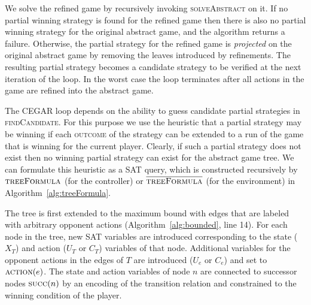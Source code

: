 We solve the refined game by recursively invoking \textsc{solveAbstract} on it.
If no partial winning strategy is found for the refined game then there is also
no partial winning strategy for the original abstract game, and the algorithm
returns a failure.  Otherwise, the partial strategy for the refined game is
\emph{projected} on the original abstract game by removing the leaves
introduced by refinements. The resulting partial strategy becomes a candidate
strategy to be verified at the next iteration of the loop. In the worst case
the loop terminates after all actions in the game are refined into the abstract
game.

The CEGAR loop depends on the ability to guess candidate partial strategies in
\textsc{findCandidate}. For this purpose we use the heuristic that a partial
strategy may be winning if each \textsc{outcome} of the strategy can be
extended to a run of the game that is winning for the current player.  Clearly,
if such a partial strategy does not exist then no winning partial strategy can
exist for the abstract game tree. We can formulate this heuristic as a SAT
query, which is constructed recursively by $\textsc{treeFormula}$ (for the
controller) or $\textsc{$\overline{\mbox{treeFormula}}$}$ (for the environment) in
Algorithm~\ref{alg:treeFormula}.

The tree is first extended to the maximum bound with edges that are labeled
with arbitrary opponent actions (Algorithm~\ref{alg:bounded}, line 14).  For
each node in the tree, new SAT variables are introduced corresponding to the
state ($X_T$) and action ($U_T$ or $C_T$) variables of that node. Additional
variables for the opponent actions in the edges of $T$ are introduced ($U_e$ or
$C_e$) and set to $\textsc{action}(e)$.  The state and action variables of node
$n$ are connected to successor nodes $\textsc{succ}(n)$ by an encoding of the
transition relation and constrained to the winning condition of the player.



